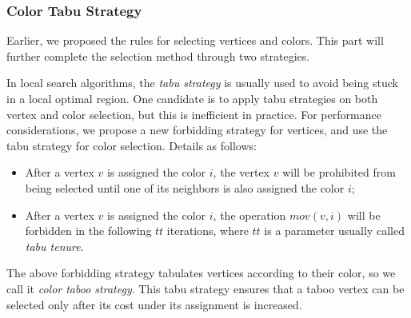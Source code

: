 \documentclass{article}
\begin{document}
\subsubsection{Color Tabu Strategy}

Earlier, we proposed the rules for selecting vertices and colors. This part will further complete the selection method through two strategies.


In local search algorithms, the {\it tabu strategy} \cite{glover1998tabu,wang2016two} is usually used to avoid being stuck in a local optimal region. One candidate is to apply tabu strategies on both vertex and color selection, but this is inefficient in practice. For performance considerations, we propose a new forbidding strategy for vertices, and use the tabu strategy for color selection. Details as follows:

\begin{itemize}
    \item After a vertex $v$ is assigned the color $i$, the vertex $v$ will be prohibited from being selected until one of its neighbors is also assigned the color $i$;
    \item After a vertex $v$ is assigned the color $i$, the operation $mov(v,i)$ will be forbidden in the following $tt$ iterations, where $tt$ is a parameter usually called {\it tabu tenure}.
\end{itemize}


The above forbidding strategy tabulates vertices according to their color, so we call it {\it color taboo strategy}. This tabu strategy ensures that a taboo vertex can be selected only after its cost under its assignment is increased.
\end{document}
